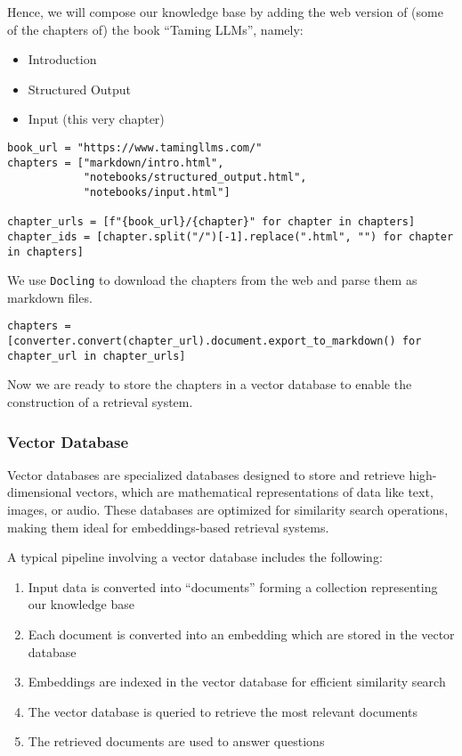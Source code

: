 Hence, we will compose our knowledge base by adding the web version of (some of the chapters of) the book ``Taming LLMs'', namely:
\begin{itemize}
    \item Introduction
    \item Structured Output
    \item Input (this very chapter)
\end{itemize}

\begin{verbatim}
book_url = "https://www.tamingllms.com/"
chapters = ["markdown/intro.html",
            "notebooks/structured_output.html",
            "notebooks/input.html"]

chapter_urls = [f"{book_url}/{chapter}" for chapter in chapters]
chapter_ids = [chapter.split("/")[-1].replace(".html", "") for chapter in chapters]
\end{verbatim}

We use \texttt{Docling} to download the chapters from the web and parse them as markdown files.

\begin{verbatim}
chapters = [converter.convert(chapter_url).document.export_to_markdown() for chapter_url in chapter_urls]
\end{verbatim}
Now we are ready to store the chapters in a vector database to enable the construction of a retrieval system.

\subsubsection{Vector Database}

Vector databases are specialized databases designed to store and retrieve high-dimensional vectors, which are mathematical representations of data like text, images, or audio. These databases are optimized for similarity search operations, making them ideal for embeddings-based retrieval systems.

A typical pipeline involving a vector database includes the following:

\begin{enumerate}
    \item Input data is converted into ``documents'' forming a collection representing our knowledge base
    \item Each document is converted into an embedding which are stored in the vector database
    \item Embeddings are indexed in the vector database for efficient similarity search
    \item The vector database is queried to retrieve the most relevant documents
    \item The retrieved documents are used to answer questions
\end{enumerate}

